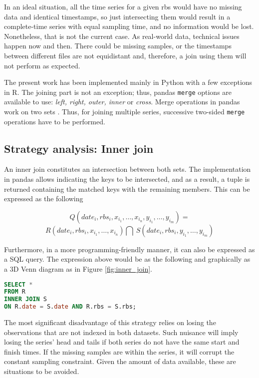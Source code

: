 In an ideal situation, all the time series for a given \ac{rbs} would have no missing data and identical timestamps, so just intersecting them would result in a complete-time series with equal sampling time, and no information would be lost.  Nonetheless, that is not the current case. As real-world data, technical issues happen now and then. There could be missing samples, or the timestamps between different files are not equidistant and, therefore, a join using them will not perform as expected.

The present work has been implemented mainly in Python with a few exceptions in R. The joining part is not an exception; thus, pandas \texttt{merge} options are available to use: \emph{left, right, outer, inner} or \emph{cross}. Merge operations in pandas work on two sets \cite{reback2020pandas}. Thus, for joining multiple series, successive two-sided \texttt{merge} operations have to be performed.

\subsection{Strategy analysis: Inner join}

An inner join constitutes an intersection between both sets. The implementation in pandas allows indicating the keys to be intersected, and as a result, a tuple is returned containing the matched keys with the remaining members. This can be expressed as the following 

$$Q(date_i, rbs_i,  x_{i_1}, \ldots, x_{i_n}, y_{i_1}, \ldots, y_{i_m}) = $$
$$  R(date_i, rbs_i, x_{i_1}, \ldots, x_{i_n}) \bigcap \
S(date_i, rbs_i, y_{i_1}, \ldots, y_{i_m}) $$

Furthermore, in a more programming-friendly manner, it can also be expressed as a SQL query. The expression above would be as the following and graphically as a 3D Venn diagram as in Figure \ref{fig:inner_join}.

\begin{lstlisting}[language=SQL]
SELECT * 
FROM R 
INNER JOIN S
ON R.date = S.date AND R.rbs = S.rbs;
\end{lstlisting}

The most significant disadvantage of this strategy relies on losing the observations that are not indexed in both datasets. Such nuisance will imply losing the series' head and tails if both series do not have the same start and finish times. If the missing samples are within the series, it will corrupt the constant sampling constraint. Given the amount of data available, these are situations to be avoided.  

